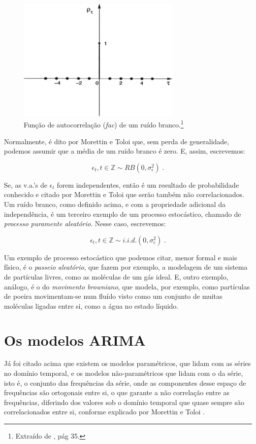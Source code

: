 \begin{figure}[htb]
\centering
\includegraphics[width=8cm]{figuras/fac_ruido}
\caption{Função de autocorrelação (\emph{fac}) de um ruído branco.\footnote{Extraído de \citep{morettin}, pág 35.}}
\label{fig:fac_ruido}
\end{figure}

Normalmente, é dito por Morettin e Toloi \citep{morettin} que, sem perda de generalidade, podemos assumir que a média de um ruído branco é zero. E, assim, escrevemos:

\[ \epsilon_t, t \in \mathbb{Z} \sim RB (0, \sigma_\epsilon^2)\;. \]

Se, as v.a.'s de $\epsilon_t$ forem independentes, então é um resultado de probabilidade conhecido e citado por Morettin e Toloi \citep{morettin} que serão também não correlacionados. Um ruído branco, como definido acima, e com a propriedade adicional da independência, é um terceiro exemplo de um processo estocástico, chamado de \emph{processo puramente aleatório}. Nesse caso, escrevemos:

\[ \epsilon_t, t \in \mathbb{Z} \sim i.i.d. (0, \sigma_\epsilon^2)\;. \]

Um exemplo de processo estocástico que podemos citar, menor formal e mais físico, é o \emph{passeio aleatório}, que fazem por exemplo, a modelagem de um sistema de partículas livres, como as moléculas de um gás ideal. E, outro exemplo, análogo, é o do \emph{movimento browniano}, que modela, por exemplo, como partículas de poeira movimentam-se num fluído visto como um conjunto de muitas moléculas ligadas entre si, como a água no estado líquido.

\section{Os modelos ARIMA}

Já foi citado acima que existem os modelos paramétricos, que lidam com as séries no domínio temporal, e os modelos não-paramétricos que lidam com o  da série, isto é, o conjunto das frequências da série, onde as componentes desse espaço de frequências são ortogonais entre si, o que garante a não correlação entre as frequências, diferindo dos valores sob o domínio temporal que quase sempre são correlacionados entre si, conforme explicado por Morettin e Toloi \citep{morettin}.

